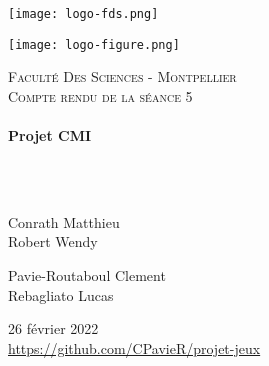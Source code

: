 \documentclass[a4paper, 12pt]{article}
\begin{document}
\begin{titlepage}
  \begin{sffamily}
  \begin{center}
  

\begin{minipage}[c]{.46\linewidth}
     \begin{center}
             \texttt{[image: logo-fds.png]}
         \end{center}
   \end{minipage} \hfill
   \begin{minipage}[c]{.46\linewidth}
    \begin{center}
            \texttt{[image: logo-figure.png]}
        \end{center}
 \end{minipage}
    \newline \newline

    \textsc{\LARGE Faculté Des Sciences - Montpellier}\\[2cm]

    \textsc{\Large Compte rendu de la séance 5}\\[1.5cm]

    \HRule \\[0.4cm]
    { \huge \bfseries Projet CMI\\[0.4cm] }

    \HRule \\[2cm]
    \\[2cm]

    \begin{minipage}{0.4\textwidth}
      \begin{flushleft} \large
        Conrath Matthieu\\
        Robert Wendy\\
      \end{flushleft}
    \end{minipage}
    \begin{minipage}{0.4\textwidth}
      \begin{flushright} \large
       Pavie-Routaboul Clement\\
        Rebagliato Lucas\\
      \end{flushright}
    \end{minipage}

    \vfill
    {\large 26 février 2022}
    \\
    {\url{https://github.com/CPavieR/projet-jeux}}

  \end{center}
  \end{sffamily}
\end{titlepage}
\end{document}
